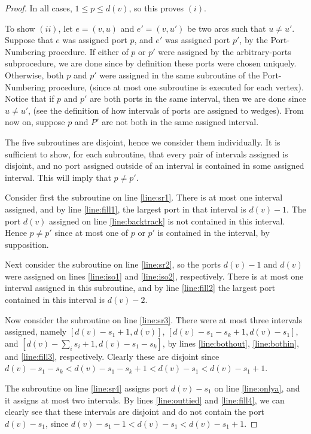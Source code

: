 \documentclass[12pt,letterpaper,oneside]{book}
\begin{document}
\begin{proof}
In all cases, $1\le p \le d(v)$, so this proves $(i)$.

To show $(ii)$, let $e=(v,u)$ and $e' = (v,u')$ be two arcs such that $u\ne u'$.  
Suppose that $e$ was assigned port 
$p$, and $e'$ was assigned port $p'$, by the Port-Numbering procedure.  If either of $p$ or $p'$ were assigned by the arbitrary-ports 
subprocedure, we are done since by definition these ports were chosen uniquely.  
Otherwise, both $p$ and $p'$ were assigned in the same subroutine 
of the Port-Numbering procedure, (since at most one subroutine is executed for each vertex).  
Notice that if $p$ and $p'$ are both ports in the same interval, then we are done since $u\ne u'$, (see  the definition of how 
intervals of ports are assigned to wedges).  From now on, suppose $p$ and $P'$ are not both in the same assigned interval.  


The five subroutines are disjoint, hence we consider them individually.  It is sufficient to show, for 
each subroutine, that every pair of intervals assigned is disjoint, 
and no port assigned outside of an interval is contained in some assigned interval.  This will imply that $p\ne p'$.  

Consider first the subroutine on line \ref{line:sr1}.  There is at most one interval assigned, and by line \ref{line:fill1}, the 
largest port in that interval is $d(v)-1$.  The port $d(v)$ assigned on line \ref{line:backtrack} is not 
contained in this interval.  Hence $p\ne p'$ since at most one of $p$ or $p'$ is contained in the interval, by supposition.

Next consider the subroutine on line \ref{line:sr2}, so the ports $d(v)-1$ and $d(v)$ were assigned on lines 
\ref{line:iso1} and \ref{line:iso2}, respectively.  There is at most one interval assigned in this subroutine, and by 
line \ref{line:fill2} the largest port contained in this interval is $d(v)-2$.   
  
Now consider the  subroutine on line \ref{line:sr3}.  
There were at most three intervals assigned, namely $[d(v)-s_1+1,d(v)]$, $[d(v)-s_1-s_k+1,d(v)-s_1]$, and $[d(v)-\sum_{i}s_i+1,d(v)-s_1-s_k]$, by 
lines \ref{line:bothout}, \ref{line:bothin}, and  \ref{line:fill3}, respectively.  
Clearly these are disjoint since 
$d(v)-s_1-s_k<d(v)-s_1-s_k+1<d(v)-s_1<d(v)-s_1+1$.   

The subroutine on line \ref{line:sr4} assigns port $d(v)-s_1$ on line \ref{line:onlya}, and it assigns at most two intervals.  
By lines \ref{line:outtied} and \ref{line:fill4}, we can clearly see that these intervals are disjoint and do not contain the port $d(v)-s_1$, 
since $d(v)-s_1-1<d(v)-s_1<d(v)-s_1+1$.


\end{proof}
\end{document}
